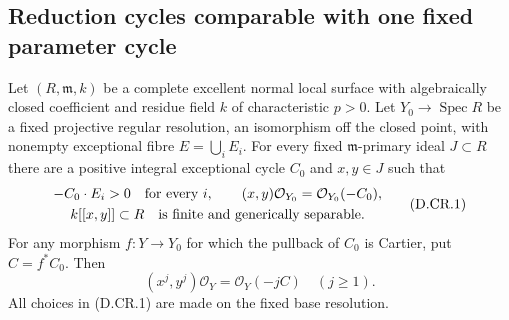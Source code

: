 \subsection{Reduction cycles comparable with one fixed parameter cycle}

\begin{lemma}
\label{D:strict-Cartier-separating-parameters}
Let $(R,\mathfrak m,k)$ be a complete excellent normal local
surface with algebraically closed coefficient and residue field
$k$ of characteristic $p>0$. Let $Y_0\to\operatorname{Spec}R$
be a fixed projective regular resolution, an isomorphism off the
closed point, with nonempty exceptional fibre $E=\bigcup_iE_i$.
For every fixed $\mathfrak m$-primary ideal $J\subset R$ there
are a positive integral exceptional cycle $C_0$ and $x,y\in J$
such that
\[
 \begin{gathered}
 -C_0\cdot E_i>0\quad\hbox{for every }i,\qquad
 (x,y)\mathcal O_{Y_0}=\mathcal O_{Y_0}(-C_0),\\
 k[[x,y]]\subset R\quad\hbox{is finite and generically separable}.
 \end{gathered}                                             \tag{D.CR.1}
\]
For any morphism $f:Y\to Y_0$ for which the pullback of $C_0$
is Cartier, put $C=f^*C_0$. Then
\[
 (x^j,y^j)\mathcal O_Y=\mathcal O_Y(-jC)
                       \quad(j\ge1).                     \tag{D.CR.2}
\]
All choices in (D.CR.1) are made on the fixed base resolution.
\end{lemma}

